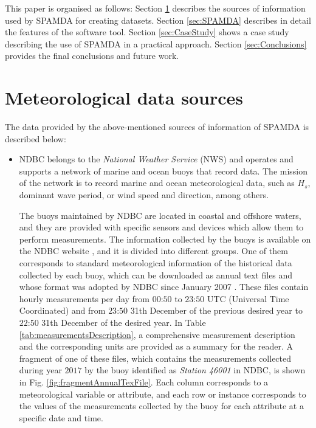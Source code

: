 \documentclass[energies,article,submit,moreauthors,pdftex]{Definitions/mdpi}
\begin{document}
		This paper is organised as follows: Section \ref{sec:DataSources} describes the sources of information used by SPAMDA for creating datasets. Section \ref{sec:SPAMDA} describes in detail the features of the software tool. Section \ref{sec:CaseStudy} shows a case study describing the use of SPAMDA in a practical approach. Section \ref{sec:Conclusions} provides the final conclusions and future work.
		
	\section{Meteorological data sources}\label{sec:DataSources}
		
		The data provided by the above-mentioned sources of information of SPAMDA is described below:
		
		\begin{itemize}
						
			\item NDBC belongs to the \textit{National Weather Service} (NWS) and operates and supports a network of marine and ocean buoys that record data. The mission of the network is to record marine and ocean meteorological data, such as $H_s$, dominant wave period, or wind speed and direction, among others.

			The buoys maintained by NDBC are located in coastal and offshore waters, and they are provided with specific sensors and devices which allow them to perform measurements. The information collected by the buoys is available on the NDBC website \cite{NOAA_1}, and it is divided into different groups. One of them corresponds to standard meteorological information of the historical data collected by each buoy, which can be downloaded as annual text files and whose format was adopted by NDBC since January 2007 \cite {NOAA_2}. These files contain hourly measurements per day from $00$:$50$ to $23$:$50$ UTC (Universal Time Coordinated) and from $23$:$50$ 31th December of the previous desired year to $22$:$50$ 31th December of the desired year. In Table \ref{tab:measurementsDescription}, a comprehensive measurement description and the corresponding units are provided as a summary for the reader. A fragment of one of these files, which contains the measurements collected during year $2017$ by the buoy identified as \textit{Station 46001} in NDBC, is shown in Fig. \ref{fig:fragmentAnnualTexFile}. Each column corresponds to a meteorological variable or attribute, and each row or instance corresponds to the values of the measurements collected by the buoy for each attribute at a specific date and time.


\end{itemize}
\end{document}

